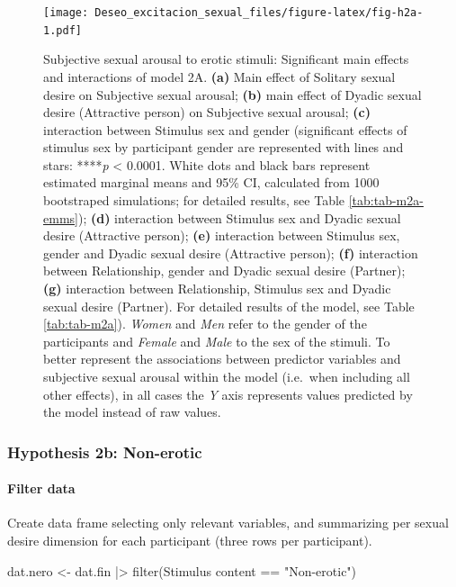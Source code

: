 \documentclass[
  bookmarksnumbered]{article}
\newenvironment{Shaded}{\begin{snugshade}}{\end{snugshade}}
\newcommand{\AttributeTok}[1]{\textcolor[rgb]{0.80,0.80,0.80}{#1}}
\newcommand{\FunctionTok}[1]{\textcolor[rgb]{0.94,0.94,0.56}{#1}}
\newcommand{\NormalTok}[1]{\textcolor[rgb]{0.80,0.80,0.80}{#1}}
\newcommand{\OtherTok}[1]{\textcolor[rgb]{0.94,0.94,0.56}{#1}}
\newcommand{\SpecialCharTok}[1]{\textcolor[rgb]{0.86,0.64,0.64}{#1}}
\newcommand{\StringTok}[1]{\textcolor[rgb]{0.80,0.58,0.58}{#1}}
\begin{document}
\begin{figure}
\centering
\texttt{[image: Deseo\_excitacion\_sexual\_files/figure-latex/fig-h2a-1.pdf]}
\caption{\label{fig:fig-h2a}Subjective sexual arousal to erotic stimuli: Significant main effects and interactions of model 2A. \textbf{(a)} Main effect of Solitary sexual desire on Subjective sexual arousal; \textbf{(b)} main effect of Dyadic sexual desire (Attractive person) on Subjective sexual arousal; \textbf{(c)} interaction between Stimulus sex and gender (significant effects of stimulus sex by participant gender are represented with lines and stars: ****\emph{p} \textless{} 0.0001. White dots and black bars represent estimated marginal means and 95\% CI, calculated from 1000 bootstraped simulations; for detailed results, see Table \ref{tab:tab-m2a-emms}); \textbf{(d)} interaction between Stimulus sex and Dyadic sexual desire (Attractive person); \textbf{(e)} interaction between Stimulus sex, gender and Dyadic sexual desire (Attractive person); \textbf{(f)} interaction between Relationship, gender and Dyadic sexual desire (Partner); \textbf{(g)} interaction between Relationship, Stimulus sex and Dyadic sexual desire (Partner). For detailed results of the model, see Table \ref{tab:tab-m2a}). \emph{Women} and \emph{Men} refer to the gender of the participants and \emph{Female} and \emph{Male} to the sex of the stimuli. To better represent the associations between predictor variables and subjective sexual arousal within the model (i.e.~when including all other effects), in all cases the \emph{Y} axis represents values predicted by the model instead of raw values.}
\end{figure}

\hypertarget{hypothesis2b}{%
\subsubsection{Hypothesis 2b: Non-erotic}\label{hypothesis2b}}

\hypertarget{filter-data-2}{%
\paragraph{Filter data}\label{filter-data-2}}

Create data frame selecting only relevant variables, and summarizing per sexual desire dimension for each participant (three rows per participant).

\begin{Shaded}
\begin{Highlighting}[]
\NormalTok{dat.nero }\OtherTok{\textless{}{-}}\NormalTok{ dat.fin }\SpecialCharTok{|\textgreater{}}
  \FunctionTok{filter}\NormalTok{(}\StringTok{\textasciigrave{}}\AttributeTok{Stimulus content}\StringTok{\textasciigrave{}} \SpecialCharTok{==} \StringTok{"Non{-}erotic"}\NormalTok{)}
\end{Highlighting}
\end{Shaded}
\end{document}
